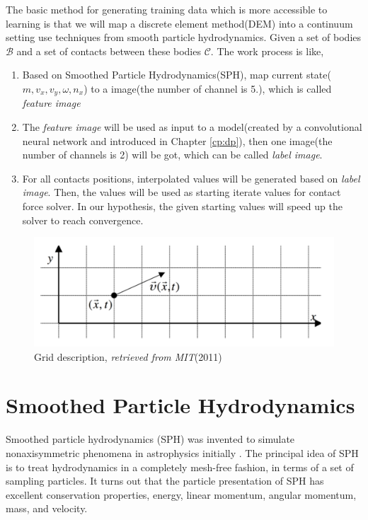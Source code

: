     The basic method for generating training data which is more accessible to learning is that we will map a discrete element method(DEM) into a continuum setting use techniques from smooth particle hydrodynamics. Given a set of bodies $\mathcal{B}$ and a set of contacts between these bodies $\mathcal{C}$. The work process is like,
    \begin{enumerate}
        \item Based on Smoothed Particle Hydrodynamics(SPH), map current state($m, v_x, v_y, \omega, n_x$) to a image(the number of channel is 5.), which is called \textit{feature image}
        \item The \textit{feature image} will be used as input to a model(created by a convolutional neural network and introduced in Chapter \ref{cp:dp}), then one image(the number of channels is 2) will be got, which can be called \textit{label image}.
        \item For all contacts positions, interpolated values will be generated based on \textit{label image}. Then, the values will be used as starting iterate values for contact force solver. In our hypothesis, the given starting values will speed up the solver to reach convergence.
    \end{enumerate}

    \begin{figure}
        \centering
        \includegraphics[scale = 0.4]{Figures/grid_method.png}
        \caption{Grid description, \textit{retrieved from MIT}(2011)}
    \end{figure}

\section{Smoothed Particle Hydrodynamics}
    Smoothed particle hydrodynamics (SPH) was invented to simulate nonaxisymmetric phenomena in astrophysics initially \cite{DBLP:journals/corr/GuWKMSSLWW15}. The principal idea of SPH is to treat hydrodynamics in a completely mesh-free fashion, in terms of a set of sampling particles. It turns out that the particle presentation of SPH has excellent conservation properties, energy, linear momentum, angular momentum, mass, and velocity.

